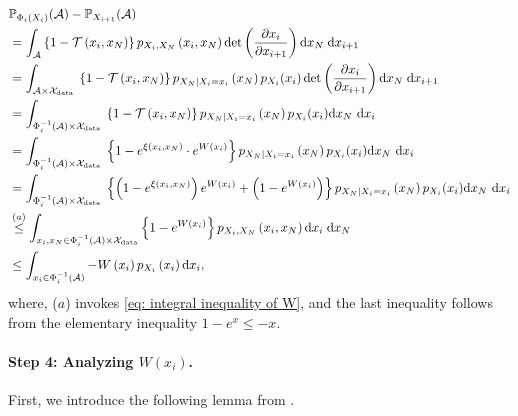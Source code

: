 \documentclass{article}
\theoremstyle{plain}
\theoremstyle{definition}
\theoremstyle{remark}
\def\cX{\mathcal{X}}
\def\dx{{\mathrm{d}x}}
\begin{document}
\begin{align*}
&\mathbb{P}_{\Phi_{i}\left(X_{i}\right)}(\mathcal{A})-\mathbb{P}_{X_{i+1}}(\mathcal{A}) \\
& =\int_{\mathcal{A}}\left\{1-\mathcal{T}\left(x_{i}, x_N\right)\right\} p_{X_{i}, X_N}\left(x_{i}, x_N\right) \operatorname{det}\left(\frac{\partial x_{i}}{\partial x_{i+1}}\right) \mathrm{d} x_N \; \dx_{i+1}\\
& =\int_{\mathcal{A} \times \mathcal{X}_{\text {data }}}\left\{1-\mathcal{T}\left(x_{i}, x_{N}\right)\right\} p_{ X_{N} \mid X_i = x_i}\left( x_{N}\right) p_{X_i}(x_i)\operatorname{det}\left(\frac{\partial x_{i}}{\partial x_{i+1}}\right) \mathrm{d} x_{N} \;  \dx_{i+1} \\
& =\int_{\Phi_{i}^{-1}(\mathcal{A}) \times \mathcal{X}_{\text {data }}}\left\{1-\mathcal{T}\left(x_i, x_N\right)\right\} p_{ X_{N} \mid X_i = x_i}\left( x_{N}\right) p_{X_i}(x_i)\mathrm{d} x_N \mathrm{~d} x_{i} \\
& =\int_{\Phi_{i}^{-1}(\mathcal{A}) \times \mathcal{X}_{\text {data }}}\left\{1-e^{\xi\left(x_i, x_N\right)} \cdot e^{W\left(x_i\right)}\right\} p_{ X_{N} \mid X_i = x_i}\left( x_{N}\right) p_{X_i}(x_i) \mathrm{d} x_N \mathrm{~d} x_{i}  \\
& = \int_{\Phi_{i}^{-1}(\mathcal{A}) \times \mathcal{X}_{\text {data }}}\left\{\left(1-e^{\xi\left(x_i, x_N\right)}\right) e^{W\left(x_i\right)}+\left(1-e^{W\left(x_i\right)}\right)\right\} p_{ X_{N} \mid X_i = x_i}\left( x_{N}\right) p_{X_i}(x_i)\mathrm{d} x_N \mathrm{~d} x_i \\
& \stackrel{(a)}{\leq} \int_{x_i, x_N \in \Phi_{i}^{-1}(\mathcal{A}) \times \cX_{\rm data}}\left\{1-e^{W\left(x_i\right)}\right\} p_{X_i, X_N}\left(x_i, x_N\right) \mathrm{d} x_i\; \dx_N \\
& \leq \int_{x_i\in \Phi_{i}^{-1}(\mathcal{A}) }-W\left(x_i\right) p_{X_i}\left(x_i       \right) \mathrm{d} x_i, 
\end{align*}
where, ($a$) invokes \eqref{eq: integral inequality of W}, and the last inequality follows from the elementary inequality $1-e^{x} \leq-x$.


\paragraph{Step 4: Analyzing $W(x_i)$.}
First, we introduce the following lemma from \cite{liang2025low}.
\end{document}
